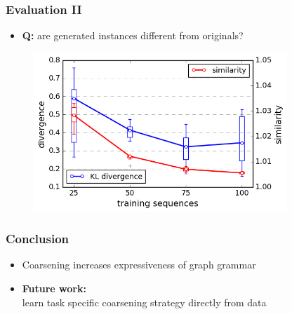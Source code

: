 \documentclass{beamer}
\begin{document}
\begin{frame}
    \frametitle{Evaluation II}
    
    \begin{itemize}
        \item {\bf Q:} are generated instances different from originals?
    \end{itemize}
   \begin{figure}[ht]
        \centering
        \includegraphics[width=0.85\textwidth]{images/learningcurve.png}
    \end{figure}
\end{frame}

\begin{frame}
    \frametitle{Conclusion}
    
    \begin{itemize}
        \item Coarsening increases expressiveness of graph grammar  
        \item {\bf Future work:} \\learn task specific coarsening strategy directly from data   
    \end{itemize}

\end{frame}
\end{document}
